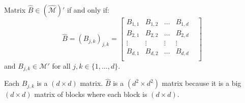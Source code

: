 \begin{claim}\label{claim-m-hat-prime}
    Matrix $\widehat{B} \in (\widehat{\mathcal{M}})'$ if and only if:
        \begin{equation}
        \widehat{B} = (B_{j,k})_{j,k} = 
    \begin{bmatrix}
    B_{1,1} & B_{1,2} & \dots &B_{1,d} \\
    B_{2,1} & B_{2,2} & \dots & B_{2,d}\\
    \vdots & \vdots & \vdots & \vdots \\
    B_{d, 1}& B_{d, 2}& \dots & B_{d,d} &\\
    \end{bmatrix}
    \end{equation}
and $B_{j,k} \in \mathcal{M}'$ for all $j,k \in \{1, \dots, d\}$.
\end{claim}
\begin{remark}
    Each $B_{j,k}$ is a $(d \times d)$ matrix. $\widehat{B}$ is a $(d^2 \times d^2)$ matrix because it is a big $(d \times d)$ matrix of blocks where each block is $(d \times d)$.
\end{remark}
